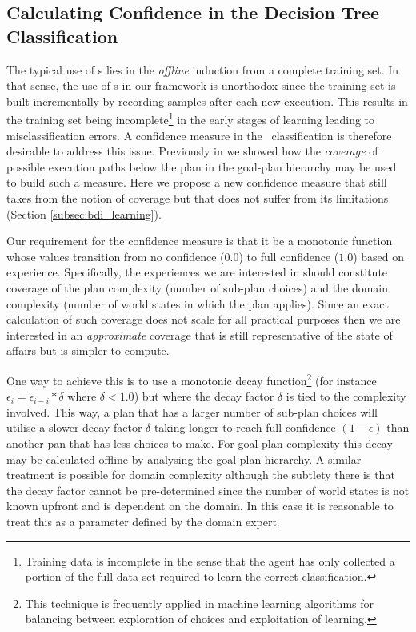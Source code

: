 \subsection{Calculating Confidence in the Decision Tree Classification}

The typical use of \dt s lies in the \textit{offline} induction from a complete training set. In that sense, the use of \dt s in our framework is unorthodox since the training set is built incrementally by recording samples after each new execution. This results in the training set being incomplete\footnote{Training data is incomplete in the sense that the agent has only collected a portion of the full data set required to learn the correct classification.} in the early stages of learning leading to misclassification errors. A confidence measure in the \dt\ classification is therefore desirable to address this issue. Previously in \cite{Singh:AAMAS10} we showed how the \textit{coverage} of possible execution paths below the plan in the goal-plan hierarchy may be used to build such a measure. Here we propose a new confidence measure that still takes from the notion of coverage but that does not suffer from its limitations (Section \ref{subsec:bdi_learning}).

Our requirement for the confidence measure is that it be a monotonic function whose values transition from no confidence ($0.0$) to full confidence ($1.0$) based on experience. Specifically, the experiences we are interested in should constitute coverage of the plan complexity (number of sub-plan choices) and the domain complexity (number of world states in which the plan applies). Since an exact calculation of such coverage does not scale for all practical purposes then we are interested in an \textit{approximate} coverage that is still representative of the state of affairs but is simpler to compute.

One way to achieve this is to use a monotonic decay function\footnote{This technique is frequently applied in machine learning algorithms for balancing between exploration of choices and exploitation of learning.} (for instance $\epsilon_i = \epsilon_{i-i} * \delta$ where $\delta < 1.0$) but where the decay factor $\delta$ is tied to the complexity involved. This way, a plan that has a larger number of sub-plan choices will utilise a slower decay factor $\delta$ taking longer to reach full confidence $(1-\epsilon)$ than another pan that has less choices to make. For goal-plan complexity this decay may be calculated offline by analysing the goal-plan hierarchy. A similar treatment is possible for domain complexity although the subtlety there is that the decay factor cannot be pre-determined since the number of world states is not known upfront and is dependent on the domain. In this case it is reasonable to treat this as a parameter defined by the domain expert.

